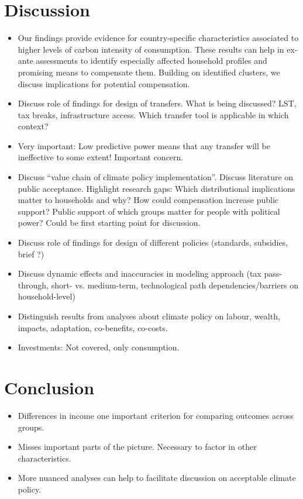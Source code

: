 \documentclass[12pt, a4paper]{article}
\begin{document}
\section{Discussion} \label{sec:discussion}

\begin{itemize}
\item Our findings provide evidence for country-specific characteristics associated to higher levels of carbon intensity of consumption. These results can help in ex-ante assessments to identify especially affected household profiles and promising means to compensate them. Building on identified clusters, we discuss implications for potential compensation.
  \item Discuss role of findings for design of transfers. What is being discussed? LST, tax breaks, infrastructure access. Which transfer tool is applicable in which context?
  \item Very important: Low predictive power means that any transfer will be ineffective to some extent! Important concern.
\item Discuss ``value chain of climate policy implementation''. Discuss literature on public acceptance. Highlight research gaps: Which distributional implications matter to households and why? How could compensation increase public support? Public support of which groups matter for people with political power? Could be first starting point for discussion.
 \item Discuss role of findings for design of different policies (standards, subsidies, brief ?)
 \item Discuss dynamic effects and inaccuracies in modeling approach (tax pass-through, short- vs. medium-term, technological path dependencies/barriers on household-level)
 \item Distinguish results from analyses about climate policy on labour, wealth, impacts, adaptation, co-benefits, co-costs.
 \item Investments: Not covered, only consumption.
\end{itemize}

\section{Conclusion} \label{sec:conclusion}

\begin{itemize}
 \item Differences in income one important criterion for comparing outcomes across groups.
 \item Misses important parts of the picture. Necessary to factor in other characteristics.
 \item More nuanced analyses can help to facilitate discussion on acceptable climate policy.
\end{itemize}
\end{document}
